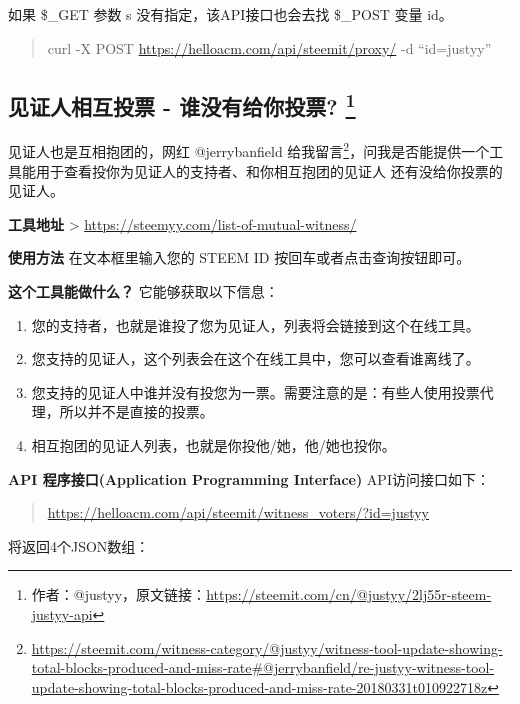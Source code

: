 \documentclass[]{ctexbook}
\providecommand{\tightlist}{%
  \setlength{\itemsep}{0pt}\setlength{\parskip}{0pt}}
\renewcommand{\href}[2]{#2\footnote{\url{#1}}}
\begin{document}
如果 \$\_GET 参数 s 没有指定，该API接口也会去找 \$\_POST 变量 id。

\begin{quote}
curl -X POST \url{https://helloacm.com/api/steemit/proxy/} -d ``id=justyy''
\end{quote}

\hypertarget{---}{%
\subsection[见证人相互投票 - 谁没有给你投票? ]{\texorpdfstring{见证人相互投票 - 谁没有给你投票? \footnote{作者：@justyy，原文链接：\url{https://steemit.com/cn/@justyy/2lj55r-steem-justyy-api}}}{见证人相互投票 - 谁没有给你投票? }}\label{---}}

见证人也是互相抱团的，网红 @jerrybanfield 给我\href{https://steemit.com/witness-category/@justyy/witness-tool-update-showing-total-blocks-produced-and-miss-rate\#@jerrybanfield/re-justyy-witness-tool-update-showing-total-blocks-produced-and-miss-rate-20180331t010922718z}{留言}，问我是否能提供一个工具能用于查看投你为见证人的支持者、和你相互抱团的见证人 还有没给你投票的见证人。

\textbf{工具地址}
\textgreater{} \url{https://steemyy.com/list-of-mutual-witness/}

\textbf{使用方法}
在文本框里输入您的 STEEM ID 按回车或者点击查询按钮即可。

\textbf{这个工具能做什么？}
它能够获取以下信息：

\begin{enumerate}
\def\labelenumi{\arabic{enumi}.}
\tightlist
\item
  您的支持者，也就是谁投了您为见证人，列表将会链接到这个在线工具。
\item
  您支持的见证人，这个列表会在这个在线工具中，您可以查看谁离线了。
\item
  您支持的见证人中谁并没有投您为一票。需要注意的是：有些人使用投票代理，所以并不是直接的投票。
\item
  相互抱团的见证人列表，也就是你投他/她，他/她也投你。
\end{enumerate}

\textbf{API 程序接口(Application Programming Interface)}
API访问接口如下：

\begin{quote}
\url{https://helloacm.com/api/steemit/witness_voters/?id=justyy}
\end{quote}

将返回4个JSON数组：
\end{document}
